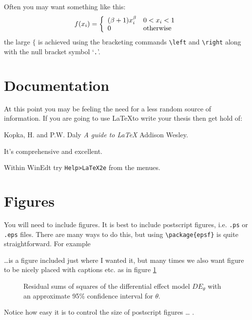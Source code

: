 \documentclass[11pt,a4paper]{article}
\begin{document}
Often you may want something like this:
$$
f(x_i)= \left \{ \begin{array}{ll} (\beta + 1) x_i^\beta & 0<x_i<1 \\ 0 & {\rm 
otherwise} \end{array} \right.
$$
the large $\{$ is achieved using the bracketing commands \verb+\left+ and \verb+\right+ along with the null bracket symbol `\verb+.+'.

\section{Documentation}

At this point you may be feeling the need for a less random source of information. If you are going to use \LaTeX to write your thesis then get hold of:

\begin{center}
Kopka, H. and P.W. Daly {\em A guide to \LaTeX} Addison Wesley.
\end{center}

\noindent It's comprehensive and excellent.

Within {\sf WinEdt } try {\tt Help>LaTeX2e} from the menues.

\section{Figures}

You will need to include figures. It is best to include postscript figures, i.e. {\tt .ps} or {\tt .eps} files. There are many ways to do this, but using \verb+\package{epsf}+ is quite straightforward. For example 

\centerline{\epsfysize=7.0cm }

\noindent \ldots is a figure included just where I wanted it, but many times we also want figure to be nicely placed with captions etc. as in figure \ref{fig:rssde}

\begin{figure}[htbp]
\begin{center}
\epsfysize=7.0cm 
\caption{Residual sums of squares of the differential effect model $DE_\theta$
with an approximate 95\% confidence interval for $\theta$.}
\label{fig:rssde}
\end{center}
\end{figure}

Notice how easy it is to control the size of postscript figures \ldots
\epsfysize=0.5cm .
\end{document}
